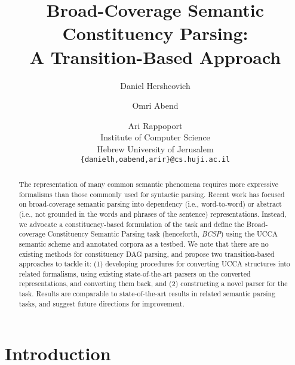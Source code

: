 \documentclass[11pt]{article}
\title{Broad-Coverage Semantic Constituency Parsing: \\
A Transition-Based Approach}
\author{Daniel Hershcovich \and Omri Abend \and Ari Rappoport \\
  Institute of Computer Science \\
  Hebrew University of Jerusalem \\
  {\tt \{danielh,oabend,arir\}@cs.huji.ac.il}
}
\date{}
\begin{document}
\maketitle

\begin{abstract}
  
  The representation of many common semantic phenomena requires
  more expressive formalisms than those commonly used for syntactic parsing.
  Recent work has focused on broad-coverage semantic parsing into dependency
  (i.e., word-to-word) or abstract (i.e., not grounded in the words and phrases of
  the sentence) representations.
  Instead, we advocate a constituency-based formulation of the
  task and define the Broad-coverage Constituency Semantic Parsing task
  (henceforth, {\it BCSP}) using the UCCA semantic scheme and
  annotated corpora as a testbed.
  We note that there are no existing methods for constituency DAG parsing,
  and propose two transition-based approaches to tackle it:
  (1) developing procedures for converting UCCA structures into related
  formalisms, using existing state-of-the-art parsers on the converted representations,
  and converting them back, and (2) constructing a novel parser for the task.
  Results are comparable to state-of-the-art results in related
  semantic parsing tasks, and suggest future directions for improvement.
  
  
\end{abstract}



\section{Introduction}
\end{document}
